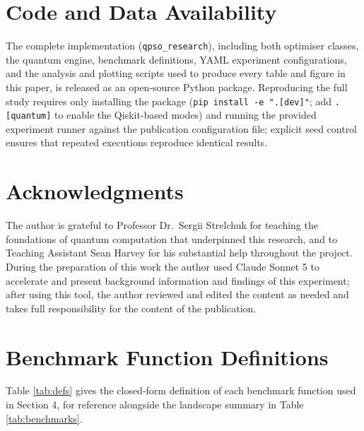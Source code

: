 \documentclass[11pt]{article}
\begin{document}
\vspace{-0.3em}
\section*{Code and Data Availability}
The complete implementation (\texttt{qpso\_research}), including both optimiser classes, the quantum engine, benchmark definitions, YAML experiment configurations, and the analysis and plotting scripts used to produce every table and figure in this paper, is released as an open-source Python package. Reproducing the full study requires only installing the package (\texttt{pip install -e ".[dev]"}; add \texttt{.[quantum]} to enable the Qiskit-based modes) and running the provided experiment runner against the publication configuration file; explicit seed control ensures that repeated executions reproduce identical results.

\vspace{-0.6em}
\section*{Acknowledgments}
\vspace{-0.3em}
The author is grateful to Professor Dr.\ Sergii Strelchuk for teaching the foundations of quantum computation that underpinned this research, and to Teaching Assistant Sean Harvey for his substantial help throughout the project. During the preparation of this work the author used Claude Sonnet 5 to accelerate and present background information and findings of this experiment; after using this tool, the author reviewed and edited the content as needed and takes full responsibility for the content of the publication.

\appendix
\section{Benchmark Function Definitions}
Table \ref{tab:defs} gives the closed-form definition of each benchmark function used in Section 4, for reference alongside the landscape summary in Table \ref{tab:benchmarks}.
\end{document}
